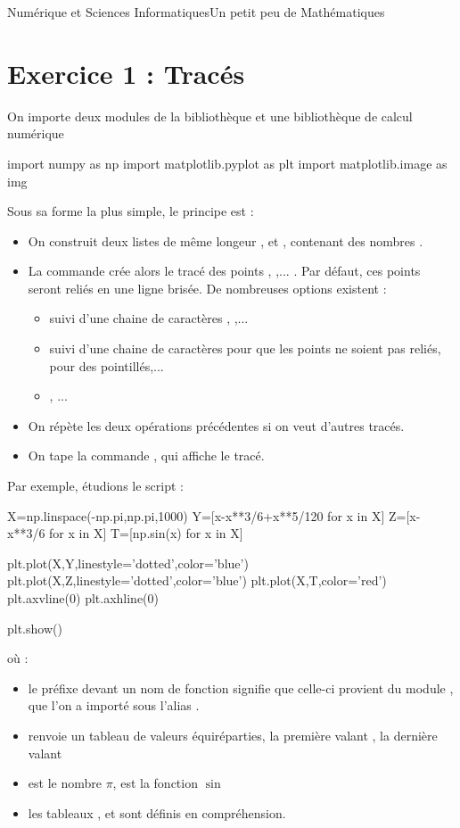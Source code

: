 \documentclass[11pt,a4paper,french,twoside]{PMCours}
\begin{document}
{Numérique et Sciences Informatiques}{Un petit peu de Mathématiques}




\section*{Exercice 1 : Tracés}
On importe deux modules de la bibliothèque  et une bibliothèque de calcul numérique 
\begin{Python}
import numpy as np
import matplotlib.pyplot as plt
import matplotlib.image as img
\end{Python}
Sous sa forme la plus simple, le principe est : 
\begin{itemize}
\item On construit deux listes de même longeur ,  et , contenant des nombres .
\item La commande  crée alors le tracé des points , ,... . Par défaut, ces points seront reliés en une ligne brisée. De nombreuses options existent : 
\begin{itemize}
\item {} suivi d'une chaine de caractères , ,...
\item {} suivi d'une chaine de caractères  pour que les points ne soient pas reliés,  pour des pointillés,...
\item {},  ...
\end{itemize}
\item On répète les deux opérations précédentes si on veut d'autres tracés.
\item On tape la commande , qui affiche le tracé. 
 \end{itemize}
Par exemple, étudions le script : 
\begin{Python}
X=np.linspace(-np.pi,np.pi,1000)
Y=[x-x**3/6+x**5/120 for x in X]
Z=[x-x**3/6 for x in X]
T=[np.sin(x) for x in X]

plt.plot(X,Y,linestyle='dotted',color='blue')
plt.plot(X,Z,linestyle='dotted',color='blue')
plt.plot(X,T,color='red')
plt.axvline(0)
plt.axhline(0)

plt.show() 
\end{Python}
o\`u  :
\begin{itemize}
\item le préfixe  devant un nom de fonction signifie que celle-ci provient du module , que l'on a importé sous l'alias .
\item {} renvoie un tableau de  valeurs équiréparties, la première valant    , la dernière valant 
\item {} est le nombre $\pi$,  est la fonction $\sin$ 
\item les tableaux ,  et  sont définis en compréhension. 
\end{itemize}
\end{document}
